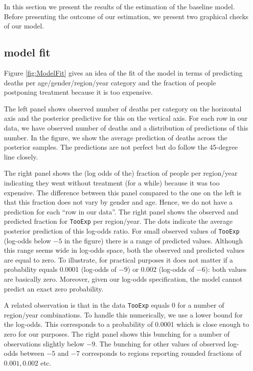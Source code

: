 \documentclass[a4paper,12pt]{article}
\begin{document}
In this section we present the results of the estimation of the baseline model. Before presenting the outcome of our estimation, we present two graphical  checks of our model.

\subsection{model fit}
\label{sec:org998b214}

Figure \ref{fig:ModelFit} gives an idea of the fit of the model in terms of predicting deaths per age/gender/region/year category and the fraction of people postponing treatment because it is too expensive.

The left panel shows observed number of deaths per category on the horizontal axis and the posterior predictive for this on the vertical axis. For each row in our data, we have observed number of deaths and a distribution of predictions of this number. In the figure, we show the average prediction of deaths across the posterior samples. The predictions are not perfect but do follow the 45-degree line closely.

The right panel shows the (log odds of the) fraction of people per region/year indicating they went without treatment (for a while) because it was too expensive. The difference between this panel compared to the one on the left is that this fraction does not vary by gender and age. Hence, we do not have a prediction for each ``row in our data''. The right panel shows the observed and predicted fraction for \texttt{TooExp} per region/year. The dots indicate the average posterior prediction of this log-odds ratio. For small observed values of \texttt{TooExp} (log-odds below \(-5\) in the figure) there is a range of predicted values. Although this range seems wide in log-odds space, both the observed and predicted values are equal to zero. To illustrate, for practical purposes it does not matter if a probability equals 0.0001 (log-odds of \(-9\)) or 0.002 (log-odds of \(-6\)): both values are basically zero. Moreover, given our log-odds specification, the model cannot predict an exact zero probability.

A related observation is that in the data \texttt{TooExp} equals 0 for a number of region/year combinations. To handle this numerically, we use a lower bound for the log-odds. This corresponds to a probability of 0.0001 which is close enough to zero for our purposes. The right panel shows this bunching for a number of observations slightly below \(-9\). The bunching for other values of observed log-odds between \(-5\) and \(-7\) corresponds to regions reporting rounded fractions of \(0.001,0.002\) etc.
\end{document}
